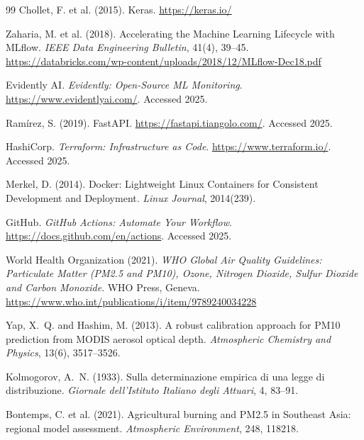 \begin{thebibliography}{99}
Chollet, F. et al. (2015). Keras. \url{https://keras.io/}


Zaharia, M. et al. (2018). Accelerating the Machine Learning Lifecycle with
MLflow. \textit{IEEE Data Engineering Bulletin}, 41(4), 39--45.
\url{https://databricks.com/wp-content/uploads/2018/12/MLflow-Dec18.pdf}

Evidently AI. \textit{Evidently: Open-Source ML Monitoring}.
\url{https://www.evidentlyai.com/}. Accessed 2025.

Ramírez, S. (2019). FastAPI. \url{https://fastapi.tiangolo.com/}.
Accessed 2025.

HashiCorp. \textit{Terraform: Infrastructure as Code}.
\url{https://www.terraform.io/}. Accessed 2025.

Merkel, D. (2014). Docker: Lightweight Linux Containers for Consistent
Development and Deployment. \textit{Linux Journal}, 2014(239).

GitHub. \textit{GitHub Actions: Automate Your Workflow}.
\url{https://docs.github.com/en/actions}. Accessed 2025.


World Health Organization (2021). \textit{WHO Global Air Quality Guidelines:
Particulate Matter (PM2.5 and PM10), Ozone, Nitrogen Dioxide, Sulfur
Dioxide and Carbon Monoxide}. WHO Press, Geneva.
\url{https://www.who.int/publications/i/item/9789240034228}

Yap, X.~Q. and Hashim, M. (2013). A robust calibration approach for PM10
prediction from MODIS aerosol optical depth. \textit{Atmospheric Chemistry
and Physics}, 13(6), 3517--3526.

Kolmogorov, A.~N. (1933). Sulla determinazione empirica di una legge di
distribuzione. \textit{Giornale dell'Istituto Italiano degli Attuari}, 4, 83--91.

Bontemps, C. et al. (2021). Agricultural burning and PM2.5 in Southeast Asia:
regional model assessment. \textit{Atmospheric Environment}, 248, 118218.

\end{thebibliography}

